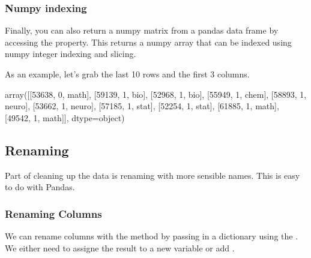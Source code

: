 \documentclass[letterpaper,10pt,english]{sphinxmanual}
\begin{document}
\subsubsection{Numpy indexing}
\label{\detokenize{content/Introduction_to_Pandas:numpy-indexing}}
Finally, you can also return a numpy matrix from a pandas data frame by accessing the  property. This returns a numpy array that can be indexed using numpy integer indexing and slicing.

As an example, let’s grab the last 10 rows and the first 3 columns.

\begin{sphinxVerbatim}[commandchars=\\\{\}]
\PYG{p}{[} \PYG{p}{]}
\end{sphinxVerbatim}

\begin{sphinxVerbatim}[commandchars=\\\{\}]
array([[53638, 0, \PYGZsq{}math\PYGZsq{}],
       [59139, 1, \PYGZsq{}bio\PYGZsq{}],
       [52968, 1, \PYGZsq{}bio\PYGZsq{}],
       [55949, 1, \PYGZsq{}chem\PYGZsq{}],
       [58893, 1, \PYGZsq{}neuro\PYGZsq{}],
       [53662, 1, \PYGZsq{}neuro\PYGZsq{}],
       [57185, 1, \PYGZsq{}stat\PYGZsq{}],
       [52254, 1, \PYGZsq{}stat\PYGZsq{}],
       [61885, 1, \PYGZsq{}math\PYGZsq{}],
       [49542, 1, \PYGZsq{}math\PYGZsq{}]], dtype=object)
\end{sphinxVerbatim}


\subsection{Renaming}
\label{\detokenize{content/Introduction_to_Pandas:renaming}}
Part of cleaning up the data is renaming with more sensible names. This is easy to do with Pandas.


\subsubsection{Renaming Columns}
\label{\detokenize{content/Introduction_to_Pandas:renaming-columns}}
We can rename columns with the  method by passing in a dictionary using the . We either need to assigne the result to a new variable or add .
\end{document}
